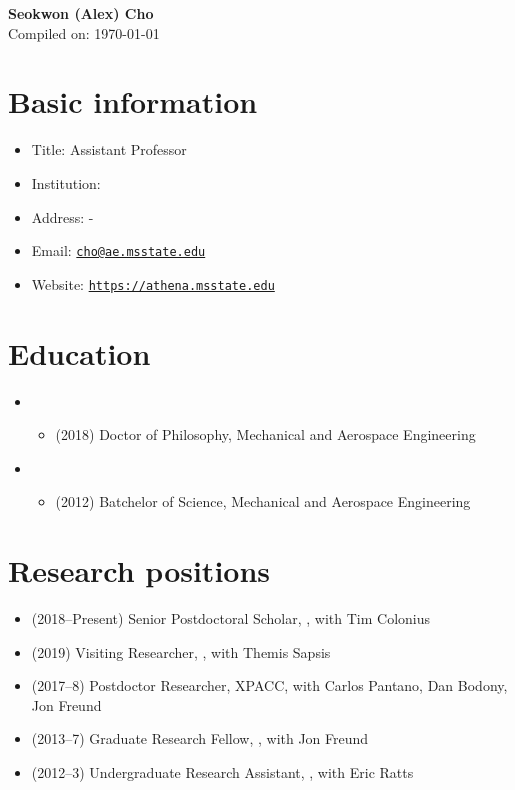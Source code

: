 



\begin{center}
    {\LARGE \bf Seokwon (Alex) Cho} \\
    \medskip
    Compiled on: \today
\end{center}

\section{Basic information}
\begin{itemize}
    \item Title: Assistant Professor
    \item Institution: \CIT
    \item Address: -
    \item Email: \href{mailto:cho@ae.msstate.edu}{\texttt{cho@ae.msstate.edu}}
    \item Website: \href{https://athena.msstate.edu}{\texttt{https://athena.msstate.edu}}
\end{itemize}

\section{Education}

\begin{itemize}
    \item \UIUC
    \begin{itemize}
        \item (2018) Doctor of Philosophy, Mechanical and Aerospace Engineering
    \end{itemize}
    \item \UMD
    \begin{itemize}
        \item (2012) Batchelor of Science, Mechanical and Aerospace Engineering
    \end{itemize}
\end{itemize}


\section{Research positions}

\begin{itemize}
    \item (2018--Present) Senior Postdoctoral Scholar, \CIT, with Tim Colonius
    \item (2019) Visiting Researcher, \MIT, with Themis Sapsis
    \item (2017--8) Postdoctor Researcher, XPACC, with Carlos Pantano, Dan Bodony, Jon Freund
    \item (2013--7) Graduate Research Fellow, \UIUC, with Jon Freund
    \item (2012--3) Undergraduate Research Assistant, \UMD, with Eric Ratts
\end{itemize}

